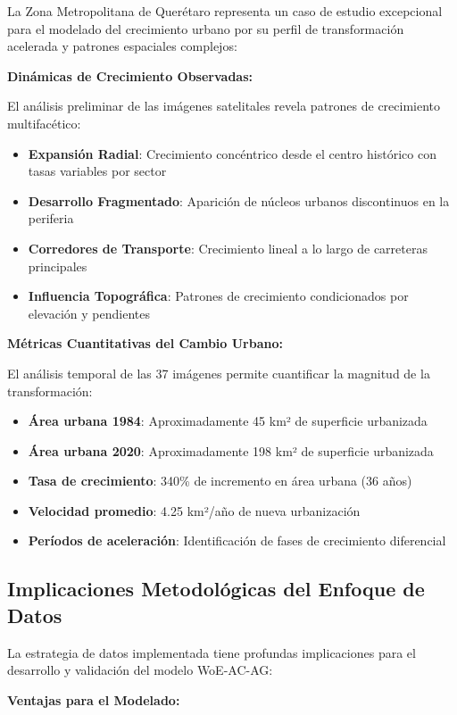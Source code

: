 \documentclass[12pt,letterpaper]{article}
\begin{document}
La Zona Metropolitana de Querétaro representa un caso de estudio excepcional para el modelado del crecimiento urbano por su perfil de transformación acelerada y patrones espaciales complejos:

\textbf{Dinámicas de Crecimiento Observadas:}

El análisis preliminar de las imágenes satelitales revela patrones de crecimiento multifacético:

\begin{itemize}
\item \textbf{Expansión Radial}: Crecimiento concéntrico desde el centro histórico con tasas variables por sector
\item \textbf{Desarrollo Fragmentado}: Aparición de núcleos urbanos discontinuos en la periferia
\item \textbf{Corredores de Transporte}: Crecimiento lineal a lo largo de carreteras principales
\item \textbf{Influencia Topográfica}: Patrones de crecimiento condicionados por elevación y pendientes
\end{itemize}

\textbf{Métricas Cuantitativas del Cambio Urbano:}

El análisis temporal de las 37 imágenes permite cuantificar la magnitud de la transformación:

\begin{itemize}
\item \textbf{Área urbana 1984}: Aproximadamente 45 km² de superficie urbanizada
\item \textbf{Área urbana 2020}: Aproximadamente 198 km² de superficie urbanizada
\item \textbf{Tasa de crecimiento}: 340\% de incremento en área urbana (36 años)
\item \textbf{Velocidad promedio}: 4.25 km²/año de nueva urbanización
\item \textbf{Períodos de aceleración}: Identificación de fases de crecimiento diferencial
\end{itemize}

\subsection{Implicaciones Metodológicas del Enfoque de Datos}

La estrategia de datos implementada tiene profundas implicaciones para el desarrollo y validación del modelo WoE-AC-AG:

\textbf{Ventajas para el Modelado:}
\end{document}
